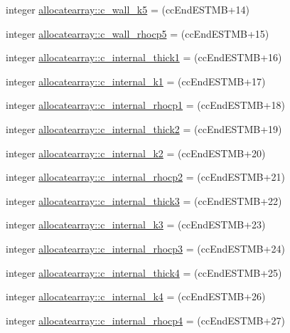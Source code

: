 \begin{DoxyCompactItemize}
\item 
integer \hyperlink{namespaceallocatearray_a5b98b9215a2082f2d78493729899d3f8}{allocatearray\+::c\+\_\+wall\+\_\+k5} = (cc\+End\+E\+S\+T\+MB+14)
\item 
integer \hyperlink{namespaceallocatearray_a37f84d7ca6d321296dc94474f3083069}{allocatearray\+::c\+\_\+wall\+\_\+rhocp5} = (cc\+End\+E\+S\+T\+MB+15)
\item 
integer \hyperlink{namespaceallocatearray_ac1b54a91457a92d6eb98b0ef303110b1}{allocatearray\+::c\+\_\+internal\+\_\+thick1} = (cc\+End\+E\+S\+T\+MB+16)
\item 
integer \hyperlink{namespaceallocatearray_a3bf034676d212cb2195d9a262c49554a}{allocatearray\+::c\+\_\+internal\+\_\+k1} = (cc\+End\+E\+S\+T\+MB+17)
\item 
integer \hyperlink{namespaceallocatearray_ab53123d58659c938997ac4cafa354b59}{allocatearray\+::c\+\_\+internal\+\_\+rhocp1} = (cc\+End\+E\+S\+T\+MB+18)
\item 
integer \hyperlink{namespaceallocatearray_a025160042f9583347ec34744280846ef}{allocatearray\+::c\+\_\+internal\+\_\+thick2} = (cc\+End\+E\+S\+T\+MB+19)
\item 
integer \hyperlink{namespaceallocatearray_ac07e6d3eb8a34554cf3e72d8aaf64393}{allocatearray\+::c\+\_\+internal\+\_\+k2} = (cc\+End\+E\+S\+T\+MB+20)
\item 
integer \hyperlink{namespaceallocatearray_a1f3c275526104fca707a950b63b52287}{allocatearray\+::c\+\_\+internal\+\_\+rhocp2} = (cc\+End\+E\+S\+T\+MB+21)
\item 
integer \hyperlink{namespaceallocatearray_a5948fd07dadcd73d96ce4235456b468d}{allocatearray\+::c\+\_\+internal\+\_\+thick3} = (cc\+End\+E\+S\+T\+MB+22)
\item 
integer \hyperlink{namespaceallocatearray_a452b162600f15987ceaa36c9a01186b0}{allocatearray\+::c\+\_\+internal\+\_\+k3} = (cc\+End\+E\+S\+T\+MB+23)
\item 
integer \hyperlink{namespaceallocatearray_aab52371de295d084f7c7c2e80eeeafeb}{allocatearray\+::c\+\_\+internal\+\_\+rhocp3} = (cc\+End\+E\+S\+T\+MB+24)
\item 
integer \hyperlink{namespaceallocatearray_a9f1c0ff39a8c3c66f6c9faeb7bb341d1}{allocatearray\+::c\+\_\+internal\+\_\+thick4} = (cc\+End\+E\+S\+T\+MB+25)
\item 
integer \hyperlink{namespaceallocatearray_a3c230d3db37cc9e9049260266500c799}{allocatearray\+::c\+\_\+internal\+\_\+k4} = (cc\+End\+E\+S\+T\+MB+26)
\item 
integer \hyperlink{namespaceallocatearray_a1fd0fd9b11afc790bcbd29f2ecab1ba2}{allocatearray\+::c\+\_\+internal\+\_\+rhocp4} = (cc\+End\+E\+S\+T\+MB+27)

\end{DoxyCompactItemize}
